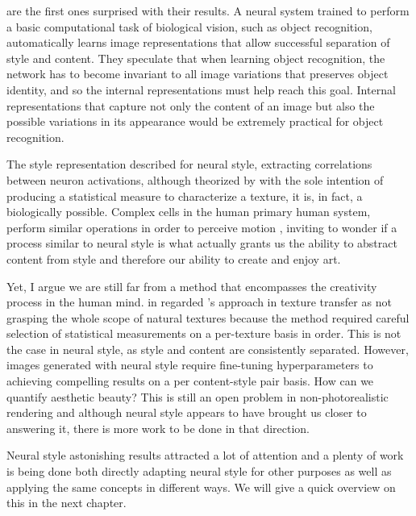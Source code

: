 \citeauthor{Gatys2015B} are the first ones surprised with their results.
A neural system trained to perform a basic computational task of biological vision, such as object recognition, automatically learns image representations that allow successful separation of style and content.
They speculate that when learning object recognition, the network has to become invariant to all image variations that preserves object identity, and so the internal representations must help reach this goal.
Internal representations that capture not only the content of an image but also the possible variations in its appearance would be extremely practical for object recognition.

The style representation described for neural style, extracting correlations between neuron activations, although theorized by \citeauthor{Gatys2015A} with the sole intention of producing a statistical measure to characterize a texture, it is, in fact, a biologically possible.
Complex cells in the human primary human system, perform similar operations in order to perceive motion \cite{Adelson1985}, inviting to wonder if a process similar to neural style is what actually grants us the ability to abstract content from style and therefore our ability to create and enjoy art.

Yet, I argue we are still far from a method that encompasses the creativity process in the human mind.
\citeauthor{Gatys2015A} in \cite{Gatys2015A} regarded \citet{Portilla2000}'s approach in texture transfer as not grasping the whole scope of natural textures because the method required careful selection of statistical measurements on a per-texture basis in order.
This is not the case in neural style, as style and content are consistently separated.
However, images generated with neural style require fine-tuning hyperparameters to achieving compelling results on a per content-style pair basis.
How can we quantify aesthetic beauty? This is still an open problem in non-photorealistic rendering \cite{Ashikhmin2003} and although neural style appears to have brought us closer to answering it, there is more work to be done in that direction.

Neural style astonishing results attracted a lot of attention and a plenty of work is being done both directly adapting neural style for other purposes as well as applying the same concepts in different ways.
We will give a quick overview on this in the next chapter.
